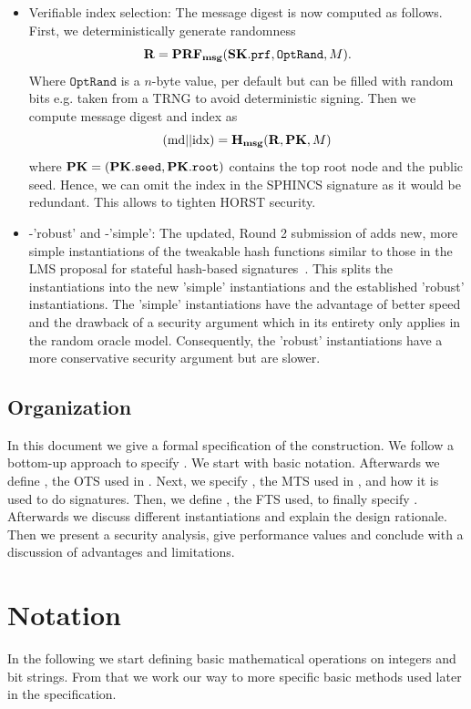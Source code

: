 \begin{itemize}
 \item Verifiable index selection: The message digest is now computed as follows.
 First, we deterministically generate randomness
        $$\mathbf{R} = \mathbf{PRF_{msg}} (\mathbf{SK}.\texttt{prf}, \texttt{OptRand}, M).$$
 Where $\texttt{OptRand}$ is a $n$-byte value, per default \pseed but can be filled 
 with random bits e.g. taken from a TRNG to avoid deterministic signing. Then we compute message 
 digest and index as
        $$( \textrm{md} || \textrm{idx} ) = \mathbf{H_{msg}} ( \mathbf{R}, \mathbf{PK}, M )$$
 where $\mathbf{PK} = (\mathbf{PK}.\texttt{seed}, \mathbf{PK}.\texttt{root})$ contains the top root node and the public seed.
 Hence, we can omit the index in the SPHINCS signature as it would be redundant.
 This allows to tighten HORST security.
 
 \item \spx-'robust' and \spx-'simple': The updated, Round 2 submission of \spx 
 adds new, more simple instantiations of the tweakable hash functions 
 similar to those in the LMS proposal for stateful hash-based 
 signatures~\cite{LMSdraft}. This splits the instantiations into the new 'simple'
 instantiations and the established 'robust' instantiations.
 The 'simple' instantiations have the advantage 
 of better speed and the drawback of a security argument which in its entirety 
 only applies in the random oracle model. Consequently, the 'robust' instantiations have a more
 conservative security argument but are slower.
\end{itemize}

\subsection{Organization}
In this document we give a formal specification of the \spx construction.
We follow a bottom-up approach to specify \spx. We start with 
basic notation. Afterwards we define \wotsp, the OTS used in \spx. Next, we
specify \xmss, the MTS used in \spx, and how it is used to do \hyper 
signatures. Then, we define \fors, the FTS used, to finally specify
\spx. Afterwards we discuss different instantiations and explain the design 
rationale. Then we present a security analysis, give performance values and
conclude with a discussion of advantages and limitations.


\section{Notation}
In the following we start defining basic mathematical operations on integers and
bit strings. From that we work our way to more specific basic methods used later
in the specification.

